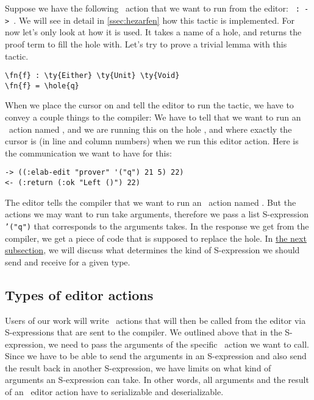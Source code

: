 Suppose we have the following \Elab\ action that we want to run from the editor:
\texttt{ :  ->  }.
We will see in detail in \autoref{ssec:hezarfen} how this tactic is
implemented. For now let's only look at how it is used. It takes a name of a
hole, and returns the proof term to fill the hole with.
Let's try to prove a trivial lemma with this tactic.

\begin{Verbatim}[framesep=2mm, label=\footnotesize{\normalfont{Idris}}, labelposition=topline]
\fn{f} : \ty{Either} \ty{Unit} \ty{Void}
\fn{f} = \hole{q}
\end{Verbatim}

When we place the cursor on  and tell the editor to run the 
tactic, we have to convey a couple things to the compiler: We have to tell that
we want to run an \Elab\ action named , and we are running this on
the hole , and where exactly the cursor is (in line and column numbers)
when we run this editor action. Here is the communication we want to have for this:

\begin{Verbatim}[framesep=2mm, label=\footnotesize{\normalfont{S-expression}}, labelposition=topline]
-> ((:elab-edit "prover" '("q") 21 5) 22)
<- (:return (:ok "Left ()") 22)
\end{Verbatim}

The editor tells the compiler that we want to run an \Elab\ action named
. But the actions we may want to run take arguments, therefore we
pass a list S-expression \texttt{'("q")} that corresponds to the arguments
 takes.
In the response we get from the compiler, we get a piece of code that is
supposed to replace the hole. In \hyperref[ssec:types]{the next subsection}, we
will discuss what determines the kind of S-expression we should send and
receive for a given type.

\subsection{Types of editor actions}\label{ssec:types}

Users of our work will write \Elab\ actions that will then be called from the
editor via S-expressions that are sent to the compiler. We outlined above that
in the S-expression, we need to pass the arguments of the specific
\Elab\ action we want to call. Since we have to be able to send the arguments
in an S-expression and also send the result back in another S-expression, we
have limits on what kind of arguments an S-expression can take.
In other words, all arguments and the result of an \Elab\ editor action
have to serializable and deserializable.

